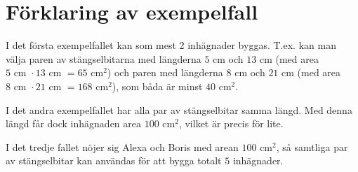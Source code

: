 \section*{Förklaring av exempelfall}
I det första exempelfallet kan som mest 2 inhägnader byggas.
T.ex. kan man välja paren av stängselbitarna med längderna $5$ cm och $13$ cm (med area $5\text{ cm } \cdot 13 \text{ cm } = 65 \text{ cm}^2$) och paren med längderna $8$ cm och $21$ cm (med area $8 \text{ cm } \cdot 21 \text{ cm }= 168 \text{ cm}^2$), som båda är minst $40 \text{ cm}^2$.

I det andra exempelfallet har alla par av stängselbitar samma längd.
Med denna längd får dock inhägnaden area $100 \text{ cm}^2$, vilket är precis för lite.

I det tredje fallet nöjer sig Alexa och Boris med arean $100 \text{ cm}^2$, så samtliga par av stängselbitar kan användas för att bygga totalt $5$ inhägnader.
